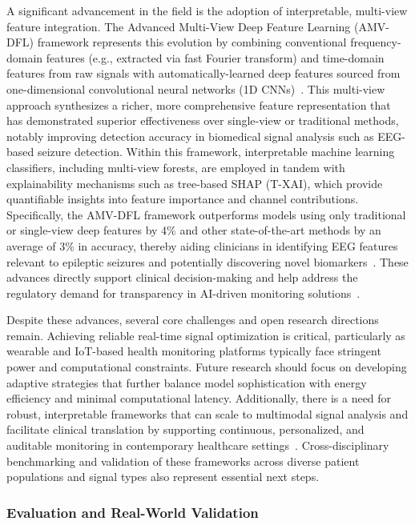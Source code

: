 \documentclass[sigconf]{acmart}
\begin{document}
A significant advancement in the field is the adoption of interpretable, multi-view feature integration. The Advanced Multi-View Deep Feature Learning (AMV-DFL) framework represents this evolution by combining conventional frequency-domain features (e.g., extracted via fast Fourier transform) and time-domain features from raw signals with automatically-learned deep features sourced from one-dimensional convolutional neural networks (1D CNNs)~\cite{ref98}. This multi-view approach synthesizes a richer, more comprehensive feature representation that has demonstrated superior effectiveness over single-view or traditional methods, notably improving detection accuracy in biomedical signal analysis such as EEG-based seizure detection. Within this framework, interpretable machine learning classifiers, including multi-view forests, are employed in tandem with explainability mechanisms such as tree-based SHAP (T-XAI), which provide quantifiable insights into feature importance and channel contributions. Specifically, the AMV-DFL framework outperforms models using only traditional or single-view deep features by 4\% and other state-of-the-art methods by an average of 3\% in accuracy, thereby aiding clinicians in identifying EEG features relevant to epileptic seizures and potentially discovering novel biomarkers~\cite{ref98}. These advances directly support clinical decision-making and help address the regulatory demand for transparency in AI-driven monitoring solutions~\cite{ref98,ref107}.

Despite these advances, several core challenges and open research directions remain. Achieving reliable real-time signal optimization is critical, particularly as wearable and IoT-based health monitoring platforms typically face stringent power and computational constraints. Future research should focus on developing adaptive strategies that further balance model sophistication with energy efficiency and minimal computational latency. Additionally, there is a need for robust, interpretable frameworks that can scale to multimodal signal analysis and facilitate clinical translation by supporting continuous, personalized, and auditable monitoring in contemporary healthcare settings~\cite{ref107}. Cross-disciplinary benchmarking and validation of these frameworks across diverse patient populations and signal types also represent essential next steps.


\subsubsection{Evaluation and Real-World Validation}
\end{document}
